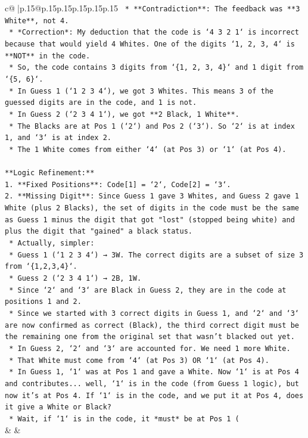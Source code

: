 \documentclass{article}
\begin{document}
{\begin{supertabular}{c@{$\;$}|p{.15\linewidth}@{}p{.15\linewidth}p{.15\linewidth}p{.15\linewidth}p{.15\linewidth}p{.15\linewidth}}
{{{\texttt{    *   **Contradiction**: The feedback was **3 White**, not 4.} \\
\texttt{    *   *Correction*: My deduction that the code is `4 3 2 1` is incorrect because that would yield 4 Whites. One of the digits `1, 2, 3, 4` is **NOT** in the code.} \\
\texttt{    *   So, the code contains 3 digits from `\{1, 2, 3, 4\}` and 1 digit from `\{5, 6\}`.} \\
\texttt{    *   In Guess 1 (`1 2 3 4`), we got 3 Whites. This means 3 of the guessed digits are in the code, and 1 is not.} \\
\texttt{    *   In Guess 2 (`2 3 4 1`), we got **2 Black, 1 White**.} \\
\texttt{        *   The Blacks are at Pos 1 (`2`) and Pos 2 (`3`). So `2` is at index 1, and `3` is at index 2.} \\
\texttt{        *   The 1 White comes from either `4` (at Pos 3) or `1` (at Pos 4).} \\
\\ 
\texttt{**Logic Refinement:**} \\
\texttt{1.  **Fixed Positions**: Code{[}1{]} = `2`, Code{[}2{]} = `3`.} \\
\texttt{2.  **Missing Digit**: Since Guess 1 gave 3 Whites, and Guess 2 gave 1 White (plus 2 Blacks), the set of digits in the code must be the same as Guess 1 minus the digit that got "lost" (stopped being white) and plus the digit that "gained" a black status.} \\
\texttt{    *   Actually, simpler:} \\
\texttt{        *   Guess 1 (`1 2 3 4`) → 3W. The correct digits are a subset of size 3 from `\{1,2,3,4\}`.} \\
\texttt{        *   Guess 2 (`2 3 4 1`) → 2B, 1W.} \\
\texttt{        *   Since `2` and `3` are Black in Guess 2, they are in the code at positions 1 and 2.} \\
\texttt{        *   Since we started with 3 correct digits in Guess 1, and `2` and `3` are now confirmed as correct (Black), the third correct digit must be the remaining one from the original set that wasn't blacked out yet.} \\
\texttt{        *   In Guess 2, `2` and `3` are accounted for. We need 1 more White.} \\
\texttt{        *   That White must come from `4` (at Pos 3) OR `1` (at Pos 4).} \\
\texttt{        *   In Guess 1, `1` was at Pos 1 and gave a White. Now `1` is at Pos 4 and contributes... well, `1` is in the code (from Guess 1 logic), but now it's at Pos 4. If `1` is in the code, and we put it at Pos 4, does it give a White or Black?} \\
\texttt{        *   Wait, if `1` is in the code, it *must* be at Pos 1 (} \\
            }
        }
    }
    & & \\ \\


\end{supertabular}}
\end{document}
